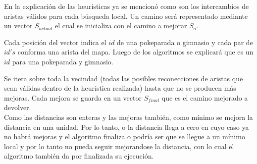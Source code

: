 En la explicación de las heurísticas ya se mencionó como son los intercambios de aristas válidos para cada búsqueda local. Un camino será representado mediante un vector $S_{actual}$ el cual se inicializa con el camino a mejorar $S_o$. 

Cada posición del vector indica el $id$ de una pokeparada o gimnasio y cada par de $id's$ conforma una arista del mapa. Luego de los algoritmos se explicará que es un $id$ para una pokeparada y gimnasio.
 
Se itera sobre toda la vecindad (todas las posibles reconecciones de aristas que sean válidas dentro de la heurística realizada) hasta que no se producen más mejoras. Cada mejora se guarda en un vector $S_{final}$ que es el camino mejorado a devolver.\\
Como las distancias son enteras y las mejoras también, como mínimo se mejora la distancia en una unidad. Por lo tanto, o la distancia llega a cero en cuyo caso ya no habrá mejoras y el algoritmo finaliza o podría ser que se llegue a un mínimo local y por lo tanto no pueda seguir mejorandose la distancia, con lo cual el algoritmo también da por finalizada su ejecución.

